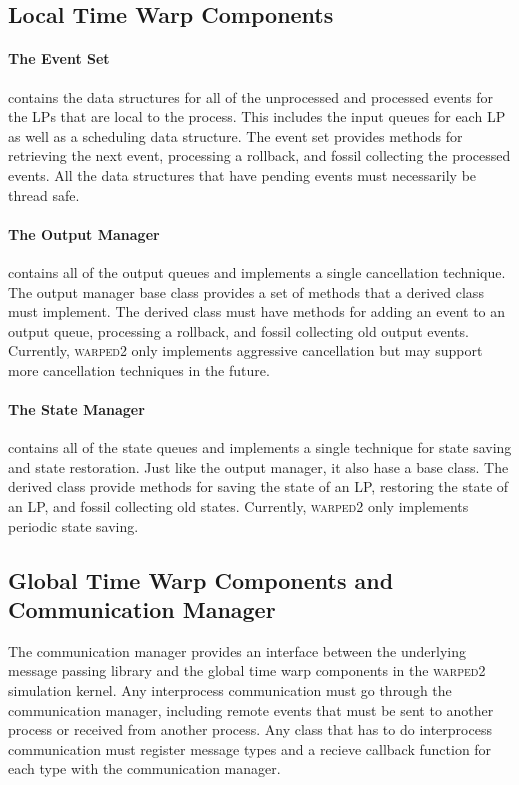 \documentclass[11pt]{book}
\begin{document}
\subsection{Local Time Warp Components}

\paragraph{The Event Set} contains the data structures for all of the unprocessed and
processed events for the LPs that are local to the process. This includes the input queues for
each LP as well as a scheduling data structure. The event set provides methods for retrieving the
next event, processing a rollback, and fossil collecting the processed events. All the data
structures that have pending events must necessarily be thread safe.

\paragraph{The Output Manager} contains all of the output queues and implements a single
cancellation technique. The output manager base class provides a set of methods that a derived
class must implement. The derived class must have methods for adding an event to an output queue,
processing a rollback, and fossil collecting old output events. Currently, \textsc{warped2} only
implements aggressive cancellation but may support more cancellation techniques in the future.

\paragraph{The State Manager} contains all of the state queues and implements a single technique
for state saving and state restoration. Just like the output manager, it also hase a base
class. The derived class provide methods for saving the state of an LP, restoring the state of
an LP, and fossil collecting old states. Currently, \textsc{warped2} only implements periodic
state saving.

\subsection{Global Time Warp Components and Communication Manager}

The communication manager provides an interface between the underlying message passing library
and the global time warp components in the \textsc{warped2} simulation kernel. Any interprocess
communication must go through the communication manager, including remote events that must be
sent to another process or received from another process. Any class that has to do interprocess
communication must register message types and a recieve callback function for each type with
the communication manager.
\end{document}
